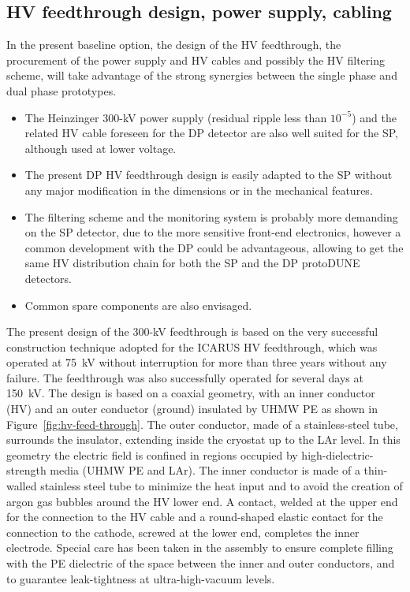 
\subsection{HV feedthrough design, power supply, cabling}
In the present baseline option, the design of the HV feedthrough, the procurement of the power supply and HV cables and possibly the HV filtering scheme, will take advantage of the strong synergies between the single phase and dual phase prototypes.

\begin{itemize}	
\item The Heinzinger 300-kV power supply (residual ripple less than $10^{-5}$) and the related HV cable foreseen for the DP detector are also well suited for the SP, although used at lower voltage.
\item The present DP HV feedthrough design is easily adapted to the SP without any major modification in the dimensions or in the mechanical features.
\item The filtering scheme and the monitoring system is probably more demanding on the SP detector, due to the more sensitive front-end electronics, however a common development with the DP could be advantageous, allowing to get the same HV distribution chain for both the SP and the DP protoDUNE detectors.
\item Common spare components are also envisaged.
\end{itemize}

The present design of the 300-kV feedthrough is based on the very successful construction technique adopted for the ICARUS HV feedthrough, which was operated at 75~kV without interruption for more than three years without any failure. The feedthrough was also successfully operated for several days at 150~kV.  
The design is based on a coaxial geometry, with an inner conductor (HV) and an outer conductor (ground) insulated by UHMW PE  as shown in Figure~\ref{fig:hv-feed-through}. The outer conductor, made of a stainless-steel tube, surrounds the insulator, extending inside the cryostat up to the LAr level. %
In this geometry the electric field is %
confined in regions occupied by high-dielectric-strength media (UHMW PE and LAr). The inner conductor is made of a thin-walled stainless steel tube to minimize the heat input and to avoid the creation of argon gas bubbles around the HV lower end. A contact, welded at the upper end for the
connection to the HV cable and a round-shaped elastic contact for the connection to the cathode, screwed at the lower end, completes the inner electrode. Special care has been taken in the assembly to ensure complete filling with the PE dielectric of the space between the inner and outer conductors, and to guarantee leak-tightness at ultra-high-vacuum levels.

